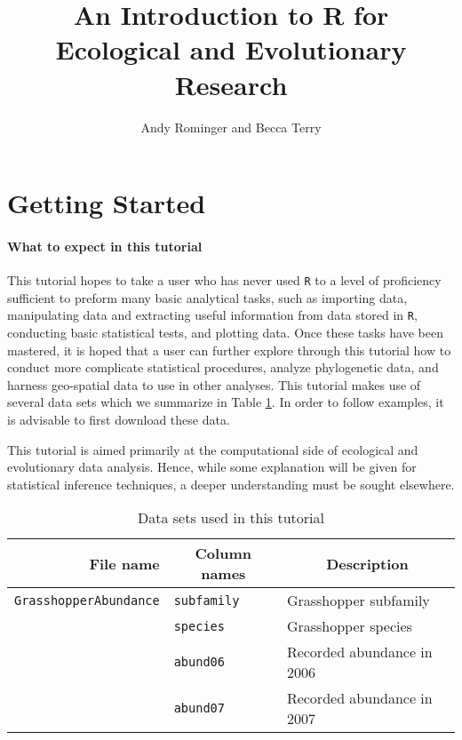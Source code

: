 \documentclass[12pt]{article}
\title{An Introduction to R for Ecological and Evolutionary Research}
\author{Andy Rominger and Becca Terry}
\date{}                                           %
\begin{document}
\maketitle

\tableofcontents

\section{Getting Started}

\paragraph{What to expect in this tutorial}
This tutorial hopes to take a user who has never used \verb+R+ to a level of proficiency sufficient to preform many basic analytical tasks, such as importing data, manipulating data and extracting useful information from data stored in \verb+R+, conducting basic statistical tests, and plotting data.  Once these tasks have been mastered, it is hoped that a user can further explore through this tutorial how to conduct more complicate statistical procedures, analyze phylogenetic data, and harness geo-spatial data to use in other analyses.  This tutorial makes use of several data sets which we summarize in Table \ref{datasets}.  In order to follow examples, it is advisable to first download these data.

This tutorial is aimed primarily at the computational side of ecological and evolutionary data analysis.  Hence, while some explanation will be given for statistical inference techniques, a deeper understanding must be sought elsewhere.

\begin{table}[!htb]
	\caption{Data sets used in this tutorial}	\label{datasets}

	\begin{tabular}{r l l}
		\hline
		File name 	&	\multicolumn{1}{c}{Column names}		&	\multicolumn{1}{c}{Description}		\\
		\hline
		\verb+GrasshopperAbundance+	&	\verb+subfamily+	&	Grasshopper subfamily			\\
									&	\verb+species+		&	Grasshopper species			\\
									&	\verb+abund06+	&	Recorded abundance in 2006		\\
									&	\verb+abund07+	&	Recorded abundance in 2007		\\
		\hline
	\end{tabular}
\end{table}
\end{document}
